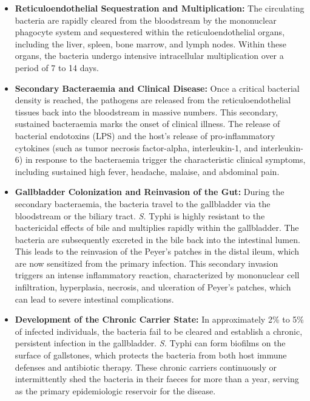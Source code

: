 \begin{itemize}
\item \textbf{Reticuloendothelial Sequestration and Multiplication:} The circulating bacteria are rapidly cleared from the bloodstream by the mononuclear phagocyte system and sequestered within the reticuloendothelial organs, including the liver, spleen, bone marrow, and lymph nodes. Within these organs, the bacteria undergo intensive intracellular multiplication over a period of 7 to 14 days.
\item \textbf{Secondary Bacteraemia and Clinical Disease:} Once a critical bacterial density is reached, the pathogens are released from the reticuloendothelial tissues back into the bloodstream in massive numbers. This secondary, sustained bacteraemia marks the onset of clinical illness. The release of bacterial endotoxins (LPS) and the host's release of pro-inflammatory cytokines (such as tumor necrosis factor-alpha, interleukin-1, and interleukin-6) in response to the bacteraemia trigger the characteristic clinical symptoms, including sustained high fever, headache, malaise, and abdominal pain.
\item \textbf{Gallbladder Colonization and Reinvasion of the Gut:} During the secondary bacteraemia, the bacteria travel to the gallbladder via the bloodstream or the biliary tract. \textit{S.} Typhi is highly resistant to the bactericidal effects of bile and multiplies rapidly within the gallbladder. The bacteria are subsequently excreted in the bile back into the intestinal lumen. This leads to the reinvasion of the Peyer's patches in the distal ileum, which are now sensitized from the primary infection. This secondary invasion triggers an intense inflammatory reaction, characterized by mononuclear cell infiltration, hyperplasia, necrosis, and ulceration of Peyer's patches, which can lead to severe intestinal complications.
\item \textbf{Development of the Chronic Carrier State:} In approximately 2\% to 5\% of infected individuals, the bacteria fail to be cleared and establish a chronic, persistent infection in the gallbladder. \textit{S.} Typhi can form biofilms on the surface of gallstones, which protects the bacteria from both host immune defenses and antibiotic therapy. These chronic carriers continuously or intermittently shed the bacteria in their faeces for more than a year, serving as the primary epidemiologic reservoir for the disease.
\end{itemize}

